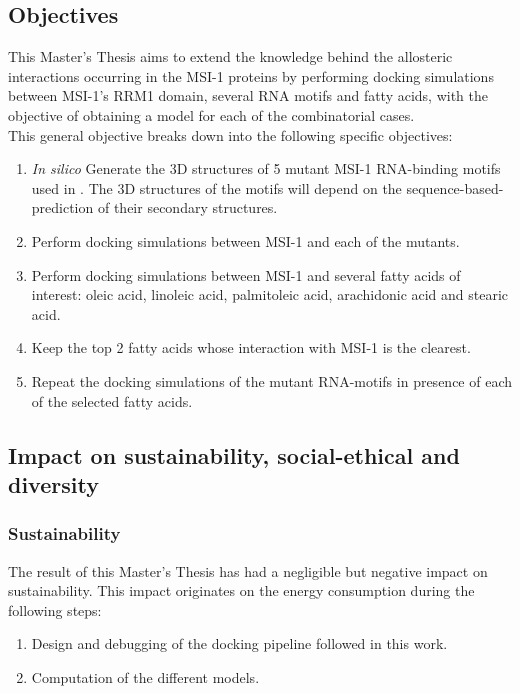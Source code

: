 \subsection{Objectives}

This Master's Thesis aims to extend the knowledge behind the allosteric interactions occurring in the MSI-1 proteins by performing docking simulations between MSI-1's RRM1 domain, several RNA motifs and fatty acids, with the objective of obtaining a model for each of the combinatorial cases.\\

This general objective breaks down into the following specific objectives:

\begin{enumerate}
    \item \textit{In silico} Generate the 3D structures of 5 mutant MSI-1 RNA-binding motifs used in \cite{dolcemascolo_2022}. The 3D structures of the motifs will depend on the sequence-based-prediction of their secondary structures.
    \item Perform docking simulations between MSI-1 and each of the mutants.
    \item Perform docking simulations between MSI-1 and several fatty acids of interest: oleic acid, linoleic acid, palmitoleic acid, arachidonic acid and stearic acid.
    \item Keep the top 2 fatty acids whose interaction with MSI-1 is the clearest.
    \item Repeat the docking simulations of the mutant RNA-motifs in presence of each of the selected fatty acids.
\end{enumerate}
    
\subsection{Impact on sustainability, social-ethical and diversity}

\subsubsection{Sustainability}

The result of this Master's Thesis has had a negligible but negative impact on sustainability. This impact originates on the energy consumption during the following steps:

\begin{enumerate}
    \item Design and debugging of the docking pipeline followed in this work.
    \item Computation of the different models.
\end{enumerate}

